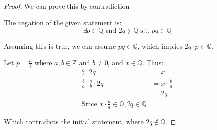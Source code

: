 \documentclass[12pt, letterpaper]{article}
\newcommand{\Q}{\mathbb{Q}}
\newcommand{\Z}{\mathbb{Z}}
\begin{document}
\begin{proof}
    We can prove this by contradiction.

    The negation of the given statement is:
    \[
        \exists p \in \Q \text{ and } 2q \notin \Q \text{ s.t. } pq \in \Q
    \]

    Assuming this is true, we can assume $pq \in \Q$, which implies $2q \cdot p \in \Q$.
    
    Let $p = \tfrac{a}{b}$ where $a,b \in \Z \text{ and } b \neq 0$, and $x \in \Q$. Thus:
    \begin{align*}
        \frac{a}{b} \cdot 2q & = x\\
        \frac{b}{a} \cdot \frac{a}{b} \cdot 2q & = x \cdot \frac{b}{a}\\
        & = 2q\\
        \text{Since } x \cdot \frac{b}{a} \in \Q,2q \in \Q
    \end{align*}

    Which contradicts the initial statement, where $2q \notin \Q$.
\end{proof}
\end{document}

